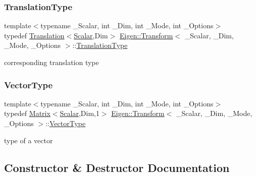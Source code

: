 \subsubsection{\texorpdfstring{TranslationType}{TranslationType}}
{\footnotesize\ttfamily template$<$typename \+\_\+\+Scalar, int \+\_\+\+Dim, int \+\_\+\+Mode, int \+\_\+\+Options$>$ \\
typedef \mbox{\hyperlink{class_eigen_1_1_translation}{Translation}}$<$\mbox{\hyperlink{class_eigen_1_1_transform_a4e69ced9d651745b8ed4eda46f41795d}{Scalar}},Dim$>$ \mbox{\hyperlink{class_eigen_1_1_transform}{Eigen\+::\+Transform}}$<$ \+\_\+\+Scalar, \+\_\+\+Dim, \+\_\+\+Mode, \+\_\+\+Options $>$\+::\mbox{\hyperlink{class_eigen_1_1_transform_a6b463d14d8be4c0eda2eed6e943b831f}{Translation\+Type}}}

corresponding translation type \mbox{\label{class_eigen_1_1_transform_aaeb4ae2f95c8edb0655fd84ab3f89e79}} 
\subsubsection{\texorpdfstring{VectorType}{VectorType}}
{\footnotesize\ttfamily template$<$typename \+\_\+\+Scalar, int \+\_\+\+Dim, int \+\_\+\+Mode, int \+\_\+\+Options$>$ \\
typedef \mbox{\hyperlink{class_eigen_1_1_matrix}{Matrix}}$<$\mbox{\hyperlink{class_eigen_1_1_transform_a4e69ced9d651745b8ed4eda46f41795d}{Scalar}},Dim,1$>$ \mbox{\hyperlink{class_eigen_1_1_transform}{Eigen\+::\+Transform}}$<$ \+\_\+\+Scalar, \+\_\+\+Dim, \+\_\+\+Mode, \+\_\+\+Options $>$\+::\mbox{\hyperlink{class_eigen_1_1_transform_aaeb4ae2f95c8edb0655fd84ab3f89e79}{Vector\+Type}}}

type of a vector 

\subsection{Constructor \& Destructor Documentation}
\mbox{\label{class_eigen_1_1_transform_a79b94ccee0f7871610fa2fa084e0fd59}} 
